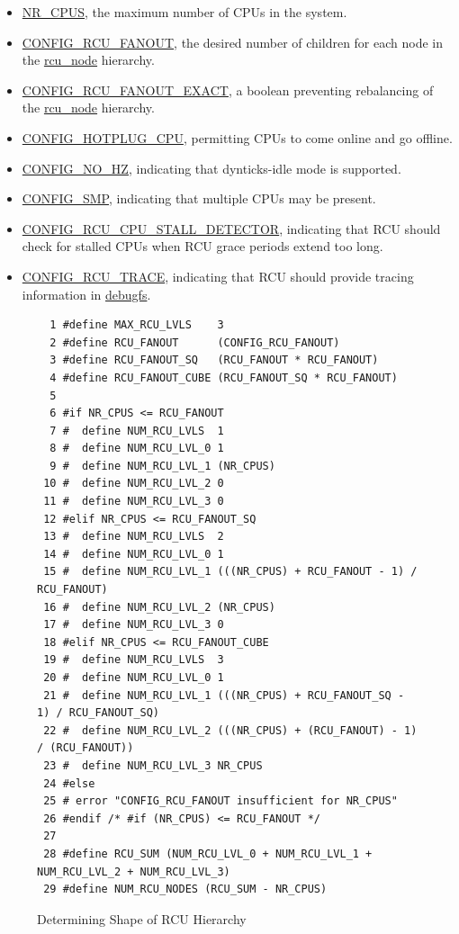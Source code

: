\begin{itemize}
\item	\url{NR_CPUS}, the maximum number of CPUs in the system.
\item	\url{CONFIG_RCU_FANOUT}, the desired number of children for
	each node in the \url{rcu_node} hierarchy.
\item	\url{CONFIG_RCU_FANOUT_EXACT}, a boolean preventing rebalancing
	of the \url{rcu_node} hierarchy.
\item	\url{CONFIG_HOTPLUG_CPU}, permitting CPUs to come online and go
	offline.
\item	\url{CONFIG_NO_HZ}, indicating that dynticks-idle mode is supported.
\item	\url{CONFIG_SMP}, indicating that multiple CPUs may be present.
\item	\url{CONFIG_RCU_CPU_STALL_DETECTOR}, indicating that RCU should
	check for stalled CPUs when RCU grace periods extend too long.
\item	\url{CONFIG_RCU_TRACE}, indicating that RCU should provide
	tracing information in \url{debugfs}.
\end{itemize}

\begin{figure}[tbp]
{
\begin{verbatim}
  1 #define MAX_RCU_LVLS    3
  2 #define RCU_FANOUT      (CONFIG_RCU_FANOUT)
  3 #define RCU_FANOUT_SQ   (RCU_FANOUT * RCU_FANOUT)
  4 #define RCU_FANOUT_CUBE (RCU_FANOUT_SQ * RCU_FANOUT)
  5 
  6 #if NR_CPUS <= RCU_FANOUT
  7 #  define NUM_RCU_LVLS  1
  8 #  define NUM_RCU_LVL_0 1
  9 #  define NUM_RCU_LVL_1 (NR_CPUS)
 10 #  define NUM_RCU_LVL_2 0
 11 #  define NUM_RCU_LVL_3 0
 12 #elif NR_CPUS <= RCU_FANOUT_SQ
 13 #  define NUM_RCU_LVLS  2
 14 #  define NUM_RCU_LVL_0 1
 15 #  define NUM_RCU_LVL_1 (((NR_CPUS) + RCU_FANOUT - 1) / RCU_FANOUT)
 16 #  define NUM_RCU_LVL_2 (NR_CPUS)
 17 #  define NUM_RCU_LVL_3 0
 18 #elif NR_CPUS <= RCU_FANOUT_CUBE
 19 #  define NUM_RCU_LVLS  3
 20 #  define NUM_RCU_LVL_0 1
 21 #  define NUM_RCU_LVL_1 (((NR_CPUS) + RCU_FANOUT_SQ - 1) / RCU_FANOUT_SQ)
 22 #  define NUM_RCU_LVL_2 (((NR_CPUS) + (RCU_FANOUT) - 1) / (RCU_FANOUT))
 23 #  define NUM_RCU_LVL_3 NR_CPUS
 24 #else
 25 # error "CONFIG_RCU_FANOUT insufficient for NR_CPUS"
 26 #endif /* #if (NR_CPUS) <= RCU_FANOUT */
 27 
 28 #define RCU_SUM (NUM_RCU_LVL_0 + NUM_RCU_LVL_1 + NUM_RCU_LVL_2 + NUM_RCU_LVL_3)
 29 #define NUM_RCU_NODES (RCU_SUM - NR_CPUS)
\end{verbatim}
}
\caption{Determining Shape of RCU Hierarchy}
\label{fig:app:rcuimpl:rcutreewt:Determining Shape of RCU Hierarchy}
\end{figure}

